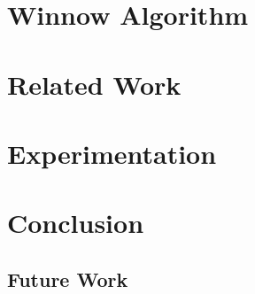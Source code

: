 \documentclass[12pt]{article}
\begin{document}
\section{Winnow Algorithm}

\section{Related Work}

\section{Experimentation}

\section{Conclusion}

\subsection{Future Work}
\end{document}
